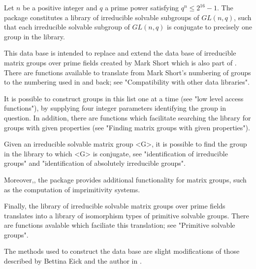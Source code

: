 

Let $n$ be a positive integer and $q$ a prime power satisfying  $q^n \leq
2^{16}-1$. The package {\IRREDSOL} constitutes a library of irreducible
solvable subgroups of $GL(n, q)$, such that each irreducible solvable
subgroup of
$GL(n, q)$ is conjugate to precisely one group in the library. 

This data base is
intended to replace and extend  the data base of irreducible matrix groups
over prime fields created by Mark Short \cite{Sho} which is also part of
{\GAP}. There are functions available to translate from Mark Short's
numbering of groups to the numbering used in {\IRREDSOL} and back; see
"Compatibility with other data libraries".

It is possible to construct groups in this list one at a time (see "low
level access functions"), by supplying four integer parameters identifying
the group in question. In addition, there are functions which facilitate 
searching the library for groups with given properties (see "Finding
matrix groups with given properties").

Given an irreducible solvable matrix group <G>, it is possible
to find the group in the library to which <G> is conjugate, see
"identification of irreducible groups" and "identification of absolutely
irreducible groups".

Moreover,, the {\IRREDSOL} package provides additional functionality
for matrix groups, such as the computation of imprimitivity systems.

Finally, the library of irreducible solvable matrix groups over prime
fields translates into a library of isomorphism types of primitive solvable
groups. There are functions avalable which faciliate this
translation; see "Primitive solvable groups".

The methods used to construct the data base are slight modifications of
those described by Bettina Eick and the author in \cite{EH}.

